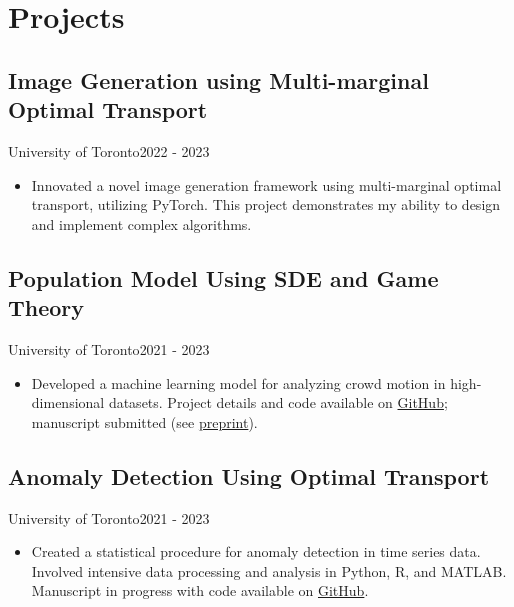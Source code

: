 \section{Projects}
\subsection{Image Generation using Multi-marginal Optimal Transport}{University of Toronto}{2022 - 2023}
\begin{itemize}[leftmargin=*]
    \item Innovated a novel image generation framework using multi-marginal optimal transport, utilizing PyTorch. This project demonstrates my ability to design and implement complex algorithms.
\end{itemize}
\subsection{Population Model Using SDE and Game Theory}{University of Toronto}{2021 - 2023}
\begin{itemize}[leftmargin=*]
    \item Developed a machine learning model for analyzing crowd motion in high-dimensional datasets. Project details and code available on \href{https://github.com/Diebrate/population_model}{GitHub}; manuscript submitted (see \href{https://www.biorxiv.org/content/10.1101/2023.08.10.552373v1}{preprint}).
\end{itemize}
\subsection{Anomaly Detection Using Optimal Transport}{University of Toronto}{2021 - 2023}
\begin{itemize}[leftmargin=*]
    \item Created a statistical procedure for anomaly detection in time series data. Involved intensive data processing and analysis in Python, R, and MATLAB. Manuscript in progress with code available on \href{https://github.com/Diebrate/scRNA_study}{GitHub}.
\end{itemize}


